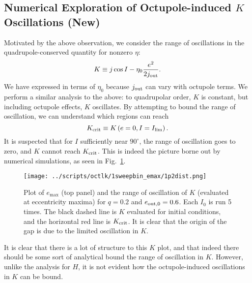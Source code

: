 \documentclass[11pt,
        usenames, %
        dvipsnames %
    ]{article}
\newcommand*{\p}[1]{\left(#1\right)}
\begin{document}
\subsection{Numerical Exploration of Octupole-induced $K$ Oscillations
(New)}

Motivated by the above observation, we consider the range of oscillations in the
quadrupole-conserved quantity for nonzero $\eta$:
\begin{equation}
    K \equiv j \cos I - \eta_0 \frac{e^2}{2j_{\rm out}}.
\end{equation}
We have expressed in terms of $\eta_0$ because $j_{\rm out}$ can vary with
octupole terms. We perform a similar analysis to the above: to quadrupolar
order, $K$ is constant, but including octupole effects, $K$ oscillates. By
attempting to bound the range of oscillation, we can understand which regions
can reach
\begin{equation}
    K_{\rm crit} \equiv K\p{e = 0, I = I_{\lim}}.
\end{equation}
It is suspected that for $I$ sufficiently near $90^\circ$, the range of
oscillation goes to zero, and $K$ cannot reach $K_{\rm crit}$. This is indeed
the picture borne out by numerical simulations, as seen in
Fig.~\ref{fig:K_amps}.
\begin{figure}
    \centering
    \texttt{[image: ../scripts/octlk/1sweepbin\_emax/1p2dist.png]}
    \caption{Plot of $e_{\max}$ (top panel) and the range of oscillation of $K$
    (evaluated at eccentricity maxima) for $q = 0.2$ and $e_{\rm out, 0} = 0.6$.
    Each $I_0$ is run 5 times. The black dashed line is $K$ evaluated for
    initial conditions, and the horizontal red line is $K_{\rm crit}$. It is
    clear that the origin of the gap is due to the limited oscillation in
    $K$.}\label{fig:K_amps}
\end{figure}

It is clear that there is a lot of structure to this $K$ plot, and that indeed
there should be some sort of analytical bound the range of oscillation in $K$.
However, unlike the analysis for $H$, it is not evident how the octupole-induced
oscillations in $K$ can be bound.
\end{document}
